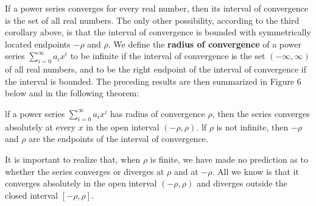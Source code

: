 If a power series converges for every real number, then its interval of convergence is the set of all real numbers. The only other possibility, according to the third corollary above, is that the interval of convergence is bounded with symmetrically located endpoints $-\rho$ and $\rho$. We define the \textbf{radius of convergence} of a power series $\sum_{i=0}^\infty a_{i}x^i$ to be infinite if the interval of convergence is the set $(-\infty, \infty)$ of all real numbers, and to be the right endpoint of the interval of convergence if the interval is bounded. The preceding results are then summarized in Figure 6 below and in the following theorem:


\begin{theorem} lf a power series $\sum_{i=0}^\infty a_{i}x^i$ has radius of convergence $\rho$, then the series converges absolutely at every $x$ in the open interval $(-\rho, \rho)$. lf $\rho$ is not infinite, then $-\rho$ and $\rho$ are the endpoints of the interval of convergence.
\end{theorem}

It is important to realize that, when $\rho$ is finite, we have made no prediction as to whether the series converges or diverges at $\rho$ and at $-\rho$. All we
know is that it converges absolutely in the open interval $(-\rho, \rho)$ and diverges outside the closed interval $[-\rho, \rho]$.


